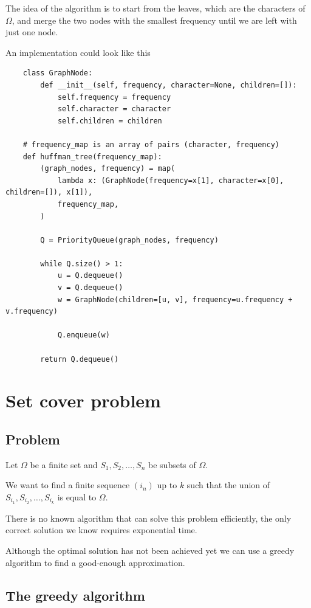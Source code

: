 \documentclass[12pt]{extarticle}
\begin{document}
The idea of the algorithm is to start from the leaves, which are the characters of $\Omega$, and merge the two nodes with the smallest frequency until we are left with just one node.

An implementation could look like this

\begin{verbatim}
    class GraphNode:
        def __init__(self, frequency, character=None, children=[]):
            self.frequency = frequency
            self.character = character
            self.children = children

    # frequency_map is an array of pairs (character, frequency)
    def huffman_tree(frequency_map):
        (graph_nodes, frequency) = map(
            lambda x: (GraphNode(frequency=x[1], character=x[0], children=[]), x[1]),
            frequency_map,
        )

        Q = PriorityQueue(graph_nodes, frequency)

        while Q.size() > 1:
            u = Q.dequeue()
            v = Q.dequeue()
            w = GraphNode(children=[u, v], frequency=u.frequency + v.frequency)

            Q.enqueue(w)

        return Q.dequeue()
\end{verbatim}

\section{Set cover problem}

\subsection{Problem}

Let $\Omega$ be a finite set and $S_1, S_2, \ldots, S_n$ be subsets of $\Omega$.

We want to find a finite sequence $\left(i_n\right)$ up to $k$ such that the union of $S_{i_1}, S_{i_2}, \ldots, S_{i_k}$ is equal to $\Omega$.

There is no known algorithm that can solve this problem efficiently, the only correct solution we know requires exponential time.

Although the optimal solution has not been achieved yet we can use a greedy algorithm to find a good-enough approximation.

\subsection{The greedy algorithm}
\end{document}
